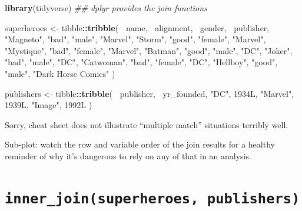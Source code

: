 \documentclass[
]{book}
\newenvironment{Shaded}{\begin{snugshade}}{\end{snugshade}}
\newcommand{\CommentTok}[1]{\textcolor[rgb]{0.56,0.35,0.01}{\textit{#1}}}
\newcommand{\KeywordTok}[1]{\textcolor[rgb]{0.13,0.29,0.53}{\textbf{#1}}}
\newcommand{\NormalTok}[1]{#1}
\newcommand{\OperatorTok}[1]{\textcolor[rgb]{0.81,0.36,0.00}{\textbf{#1}}}
\newcommand{\StringTok}[1]{\textcolor[rgb]{0.31,0.60,0.02}{#1}}
\begin{document}
\begin{Shaded}
\begin{Highlighting}[]
\KeywordTok{library}\NormalTok{(tidyverse) }\CommentTok{## dplyr provides the join functions}

\NormalTok{superheroes <-}\StringTok{ }\NormalTok{tibble}\OperatorTok{::}\KeywordTok{tribble}\NormalTok{(}
       \OperatorTok{~}\NormalTok{name, }\OperatorTok{~}\NormalTok{alignment,  }\OperatorTok{~}\NormalTok{gender,          }\OperatorTok{~}\NormalTok{publisher,}
   \StringTok{"Magneto"}\NormalTok{,      }\StringTok{"bad"}\NormalTok{,   }\StringTok{"male"}\NormalTok{,            }\StringTok{"Marvel"}\NormalTok{,}
     \StringTok{"Storm"}\NormalTok{,     }\StringTok{"good"}\NormalTok{, }\StringTok{"female"}\NormalTok{,            }\StringTok{"Marvel"}\NormalTok{,}
  \StringTok{"Mystique"}\NormalTok{,      }\StringTok{"bad"}\NormalTok{, }\StringTok{"female"}\NormalTok{,            }\StringTok{"Marvel"}\NormalTok{,}
    \StringTok{"Batman"}\NormalTok{,     }\StringTok{"good"}\NormalTok{,   }\StringTok{"male"}\NormalTok{,                }\StringTok{"DC"}\NormalTok{,}
     \StringTok{"Joker"}\NormalTok{,      }\StringTok{"bad"}\NormalTok{,   }\StringTok{"male"}\NormalTok{,                }\StringTok{"DC"}\NormalTok{,}
  \StringTok{"Catwoman"}\NormalTok{,      }\StringTok{"bad"}\NormalTok{, }\StringTok{"female"}\NormalTok{,                }\StringTok{"DC"}\NormalTok{,}
   \StringTok{"Hellboy"}\NormalTok{,     }\StringTok{"good"}\NormalTok{,   }\StringTok{"male"}\NormalTok{, }\StringTok{"Dark Horse Comics"}
\NormalTok{  )}

\NormalTok{publishers <-}\StringTok{ }\NormalTok{tibble}\OperatorTok{::}\KeywordTok{tribble}\NormalTok{(}
  \OperatorTok{~}\NormalTok{publisher, }\OperatorTok{~}\NormalTok{yr_founded,}
        \StringTok{"DC"}\NormalTok{,       1934L,}
    \StringTok{"Marvel"}\NormalTok{,       1939L,}
     \StringTok{"Image"}\NormalTok{,       1992L}
\NormalTok{  )}
\end{Highlighting}
\end{Shaded}

Sorry, cheat sheet does not illustrate ``multiple match'' situations terribly well.

Sub-plot: watch the row and variable order of the join results for a healthy reminder of why it's dangerous to rely on any of that in an analysis.

\hypertarget{inner_joinsuperheroes-publishers}{%
\section{\texorpdfstring{\texttt{inner\_join(superheroes,\ publishers)}}{inner\_join(superheroes, publishers)}}\label{inner_joinsuperheroes-publishers}}
\end{document}
